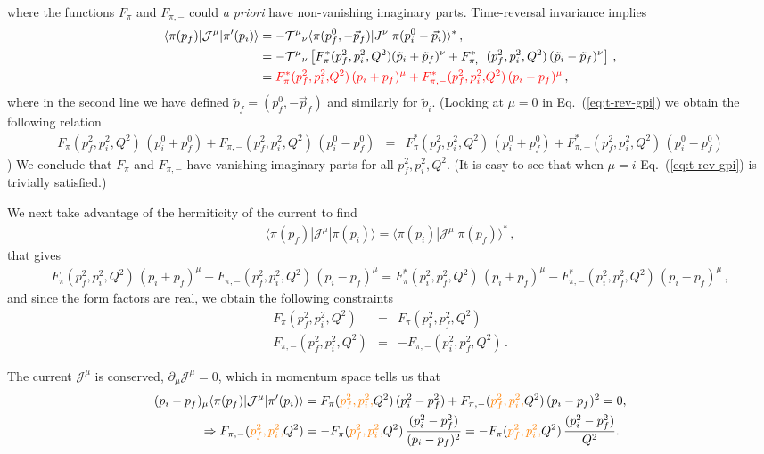 	{\ab where the functions $F_\pi$ and $F_{\pi,-}$ could {\em a priori} have non-vanishing imaginary parts.
	Time-reversal invariance implies
	\begin{align}
	\langle\pi(p_f)|{\mathcal{J}}^{\mu}|\pi'(p_i)\rangle&= -{{\cal T}^\mu}_\nu \langle\pi(p_f^0,-\vec{p}_f)|J^\nu|\pi(p_i^0-\vec{p}_i)\rangle^*\,, \\
	&=- {{\cal T}^\mu}_\nu \left[F^*_\pi(p_f^2,p_i^2,Q^2)(\tilde{p}_i+\tilde{p}_f)^\nu+F^*_{\pi,-}(p_f^2,p_i^2,Q^2)\,(\tilde{p}_i-\tilde{p}_f)^\nu\right] \,, \label{eq:t-rev-gpi} \\
	&={\color{red} F^*_\pi({  p_f^2,p_i^2,}Q^2)\,(p_i+p_f)^\mu+F^*_{\pi,-}({  p_f^2,p_i^2,}Q^2)\,(p_i-p_f)^\mu } \,,
	\end{align}
	where in the second line we have defined $\tilde{p}_f=(p^0_f,-\vec{p}_f)$ and similarly for $\tilde{p}_i$. 
	{ (Looking at $\mu =0$ in Eq.~(\ref{eq:t-rev-gpi}) we obtain the following relation
	\begin{eqnarray}
	F_\pi(p_f^2,p_i^2,Q^2)\,(p^0_i+p^0_f)+F_{\pi,-}(p_f^2,p_i^2,Q^2)\,(p_i^0-p_f^0)&=&
	F^*_\pi(p_f^2,p_i^2,Q^2)\,(p^0_i+p^0_f)+F^*_{\pi,-}(p_f^2,p_i^2,Q^2)\,(p_i^0-p_f^0)
	\end{eqnarray})}
	We conclude that $F_\pi$ and $F_{\pi,-}$ have vanishing imaginary parts for all $p_f^2,p_i^2,Q^2$.
	{\mh (It is easy to see that when $\mu=i$ Eq.~(\ref{eq:t-rev-gpi}) is trivially satisfied.)}
	
	We next take advantage of the hermiticity of the current to find
	\begin{align}
	\langle\pi(p_f)|{\mathcal{J}}^{\mu}|\pi(p_i)\rangle=\langle\pi(p_i)|{\mathcal{J}}^{\mu}|\pi(p_f)\rangle^*\, ,
	\end{align}
	that gives
	\begin{align}
	F_\pi(p_f^2,p_i^2,Q^2)\,(p_i+p_f)^\mu+F_{\pi,-}(p_f^2,p_i^2,Q^2)\,(p_i-p_f)^\mu=
	F^*_\pi(p_i^2,p_f^2,Q^2)\,(p_i+p_f)^\mu-F^*_{\pi,-}(p_i^2,p_f^2,Q^2)\,(p_i-p_f)^\mu\, ,
	\end{align}
	and since the form factors are real, we obtain the following constraints
	\begin{eqnarray}
	F_\pi(p_f^2,p_i^2,Q^2)&=&F_\pi(p_i^2,p_f^2,Q^2)\, \\
	F_{\pi,-}(p_f^2,p_i^2,Q^2)&=&-F_{\pi,-}(p_i^2,p_f^2,Q^2)\, .
	\end{eqnarray}}
The current ${\mathcal{J}}^{\mu}$ is conserved, $\partial_\mu {\mathcal{J}}^{\mu}=0$, which in momentum space tells us that
	\begin{align}
	(p_i-p_f)_\mu\langle\pi(p_f)|{\mathcal{J}}^{\mu}|\pi'(p_i)\rangle&=
	F_{\pi}({\color{orange} p_f^2,p_i^2,}Q^2)\, (p_i^2-p_f^2)
	+
	F_{\pi,-}({\color{orange} p_f^2,p_i^2,}Q^2)\,(p_i-p_f)^2
	=0,
	\\
	\Rightarrow
	F_{\pi,-}({\color{orange} p_f^2,p_i^2,}Q^2)
	&=-
	F_{\pi}({\color{orange} p_f^2,p_i^2,}Q^2)\, \frac{(p_i^2-p_f^2)}{(p_i-p_f)^2}
	= 
	-F_{\pi}({\color{orange} p_f^2,p_i^2,}Q^2)\, \frac{(p_i^2-p_f^2)}{Q^2}.
	\end{align}
